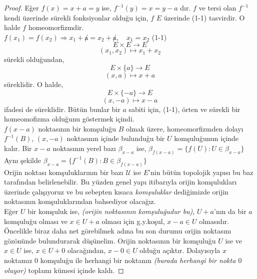 \documentclass[11pt]{article}
\theoremstyle{plain}
\theoremstyle{definition}
\theoremstyle{remark}
\numberwithin{equation}{section}
\renewcommand{\%}{{\small \%}}
\begin{document}
\begin{proof}
Eğer $f(x)=x+a=y$ ise, $f^{-1}(y)=x=y-a$ dır. $f$ ve tersi olan $f^{-1}$ kendi üzerinde sürekli fonksiyonlar olduğu için, $f$ $E$ üzerinde (1-1) tasvirdir. O halde $f$ homeomorfizmdir.\\
$f(x_1)=f(x_2)\Longrightarrow x_1 +\not a=x_2 +\not a,\quad  x_1 =x_2$ (1-1)\\
\[
E\times E\longrightarrow E
\]
\[
\left(x_1 ,x_2\right)\longmapsto x_1 +x_2 
\]
sürekli olduğundan,
\[
E\times \{a\}\longrightarrow E
\]
\[
\left(x,a\right)\longmapsto x+a 
\]
süreklidir. O halde,
\[
E\times \{-a\}\longrightarrow E
\]
\[
\left(x,-a\right)\longmapsto x-a 
\]
ifadesi de süreklidir. Bütün bunlar bir $a$ sabiti için, (1-1), örten ve sürekli bir homeomofizma olduğunu göstermek içindi.\\
$f(x-a)$ noktasının bir komşuluğu $B$ olmak üzere, homeomorfizmden dolayı $f^{-1}(B)$, $(x,-a)$ noktasının içinde bulunduğu bir $U$ komşuluğunun içinde kalır. Bir $x-a$ noktasının yerel bazı $\beta_{x-a}$ ise,  $\beta_{f(x-a)}=\big\{f(U):U\in\beta_{x-a}\big\}$\\
Aynı şekilde $\beta_{x-a}=\big\{f^{-1}(B):B\in\beta_{f(x-a)}\big\}$\\[2pt]
 
Orijin noktası komşuluklarının bir bazı $\mathscr{U}$ ise $E$'nin bütün topolojik yapısı bu baz tarafından belirlenebilir. Bu yüzden genel yapı itibarıyla orijin komşulukları üzerinde çalışıyoruz ve bu sebepten kısaca \emph{komşuluklar} dediğimizde orijin noktasının komşuluklarından bahsediyor olacağız.\\
Eğer $U$ bir komşuluk ise, \emph{(orijin noktasının komşuluğudur bu)}, $U+a$'nın da bir $a$ komşuluğu olması ve $x\in U+a$ olması için g.y.koşul, $x-a\in U$ olmasıdır.\\
Öncelikle biraz daha net görebilmek adına bu son durumu orijin noktasını gözönünde bulundurarak düşünelim. Orijin noktasının bir komşuluğu $U$ ise ve $x\in U$ ise, $x\in U+0$ olacağından, $x-0\in U$ olduğu açıktır. Dolayısıyla $x$ noktamız $0$ komşuluğu ile herhangi bir noktanın \emph{(burada herhangi bir nokta $0$ oluyor)} toplamı kümesi içinde kaldı.
\end{proof}
\end{document}
